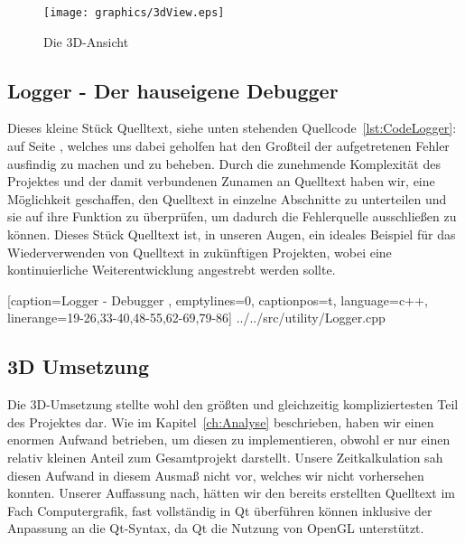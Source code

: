 \documentclass[a4paper]{scrartcl}
\begin{document}
\begin{figure}[H]
 \centering
 \texttt{[image: graphics/3dView.eps]}
 \caption{Die 3D-Ansicht}
 \label{fig:3dVuew}
\end{figure} 

\subsection{Logger - Der hauseigene Debugger}\label{ch:Logger}
Dieses kleine Stück Quelltext, siehe unten stehenden Quellcode~\ref{lst:CodeLogger}: auf Seite \pageref{lst:CodeLogger}, welches uns dabei geholfen hat den Großteil der aufgetretenen Fehler ausfindig zu machen und zu beheben. Durch die zunehmende Komplexität des Projektes und der damit verbundenen Zunamen an Quelltext haben wir, eine Möglichkeit geschaffen, den Quelltext in einzelne Abschnitte zu unterteilen und sie auf ihre Funktion zu überprüfen, um dadurch die Fehlerquelle ausschließen zu können. Dieses Stück Quelltext ist, in unseren Augen, ein ideales Beispiel für das Wiederverwenden von Quelltext in zukünftigen Projekten, wobei eine kontinuierliche Weiterentwicklung angestrebt werden sollte.

    [caption={Logger - Debugger} 	%
    	\label{lst:CodeLogger},			%
    emptylines=0,					%
    captionpos=t,					%
    language=c++,					%
    linerange={19-26,33-40,48-55,62-69,79-86}]%
{../../src/utility/Logger.cpp}		%
\subsection{3D Umsetzung}\label{ch:3DUmsetzung}
Die 3D-Umsetzung stellte wohl den größten und gleichzeitig kompliziertesten Teil des Projektes dar. Wie im Kapitel~\ref{ch:Analyse} beschrieben, haben wir einen enormen Aufwand betrieben, um diesen zu implementieren, obwohl er nur einen relativ kleinen Anteil zum Gesamtprojekt darstellt. Unsere Zeitkalkulation sah diesen Aufwand in diesem Ausmaß nicht vor, welches wir nicht vorhersehen konnten. Unserer Auffassung nach, hätten wir den bereits erstellten Quelltext im Fach Computergrafik, fast vollständig in Qt überführen können inklusive der Anpassung an die Qt-Syntax, da Qt die Nutzung von OpenGL unterstützt. 

\end{document}
